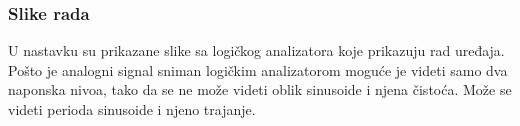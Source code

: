 \subsubsection{Slike rada}

U nastavku su prikazane slike sa logičkog analizatora koje prikazuju rad uređaja.
Pošto je analogni signal sniman logičkim analizatorom moguće je videti samo dva
naponska nivoa, tako da se ne može videti oblik sinusoide i njena čistoća.
Može se videti perioda sinusoide i njeno trajanje. \\

\begin{figure}[H]
\end{figure}

\begin{figure}[H]
\end{figure}

\begin{figure}[H]
\end{figure}

